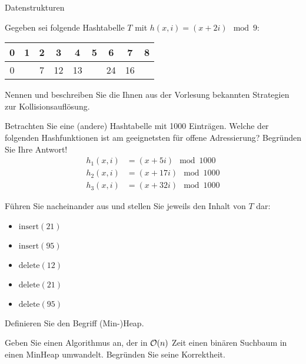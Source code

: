 \documentclass{exercisesheet}
\begin{document}
\begin{eexercises}{Datenstrukturen}{
    Gegeben sei folgende Hashtabelle $T$ mit $h(x, i) = (x + 2i) \mod 9$:
    \begin{tabular}{c|c|c|c|c|c|c|c|c}
      0 & 1 & 2 & 3  & 4  & 5 & 6  & 7  & 8 \\
      \hline
      0 &   & 7 & 12 & 13 &   & 24 & 16 &   \\
    \end{tabular}
  }
  \item Nennen und beschreiben Sie die Ihnen aus der Vorlesung bekannten Strategien zur Kollisionsauflösung.
  \item Betrachten Sie eine (andere) Hashtabelle mit 1000 Einträgen. Welche der folgenden Hashfunktionen ist am geeignetsten für offene Adressierung? Begründen Sie Ihre Antwort!
  \begin{align*}
    h_1(x, i) & = (x + 5i) \mod 1000  \\
    h_2(x, i) & = (x + 17i) \mod 1000 \\
    h_3(x, i) & = (x + 32i) \mod 1000
  \end{align*}
  \item Führen Sie nacheinander aus und stellen Sie jeweils den Inhalt von $T$ dar:
  \begin{itemize}
    \item $\text{insert}(21)$
    \item $\text{insert}(95)$
    \item $\text{delete}(12)$
    \item $\text{delete}(21)$
    \item $\text{delete}(95)$
  \end{itemize}
  \item Definieren Sie den Begriff (Min-)Heap.
  \item Geben Sie einen Algorithmus an, der in $\mathcal{O}(n)$ Zeit einen binären Suchbaum in einen MinHeap umwandelt. Begründen Sie seine Korrektheit.
\end{eexercises}
\end{document}
